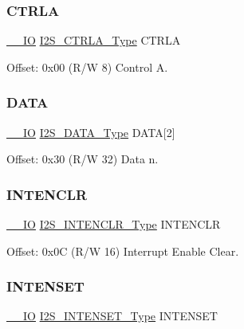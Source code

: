 \mbox{\label{struct_i2s_a9283c3350b6c2e04296fed8cf61be81b}} 
\subsubsection{\texorpdfstring{CTRLA}{CTRLA}}
{\footnotesize\ttfamily \mbox{\hyperlink{core__cm0plus_8h_aec43007d9998a0a0e01faede4133d6be}{\+\_\+\+\_\+\+IO}} \mbox{\hyperlink{union_i2_s___c_t_r_l_a___type}{I2\+S\+\_\+\+C\+T\+R\+L\+A\+\_\+\+Type}} C\+T\+R\+LA}



Offset\+: 0x00 (R/W 8) Control A. 

\mbox{\label{struct_i2s_a87228deaa60486edbc1bb08edca4e971}} 
\subsubsection{\texorpdfstring{DATA}{DATA}}
{\footnotesize\ttfamily \mbox{\hyperlink{core__cm0plus_8h_aec43007d9998a0a0e01faede4133d6be}{\+\_\+\+\_\+\+IO}} \mbox{\hyperlink{union_i2_s___d_a_t_a___type}{I2\+S\+\_\+\+D\+A\+T\+A\+\_\+\+Type}} D\+A\+TA\mbox{[}2\mbox{]}}



Offset\+: 0x30 (R/W 32) Data n. 

\mbox{\label{struct_i2s_a74d9fa452e3c9c2c39e61ce72320c4b9}} 
\subsubsection{\texorpdfstring{INTENCLR}{INTENCLR}}
{\footnotesize\ttfamily \mbox{\hyperlink{core__cm0plus_8h_aec43007d9998a0a0e01faede4133d6be}{\+\_\+\+\_\+\+IO}} \mbox{\hyperlink{union_i2_s___i_n_t_e_n_c_l_r___type}{I2\+S\+\_\+\+I\+N\+T\+E\+N\+C\+L\+R\+\_\+\+Type}} I\+N\+T\+E\+N\+C\+LR}



Offset\+: 0x0C (R/W 16) Interrupt Enable Clear. 

\mbox{\label{struct_i2s_a9a8942c1f47510e4f02c5ce67a9a7cd2}} 
\subsubsection{\texorpdfstring{INTENSET}{INTENSET}}
{\footnotesize\ttfamily \mbox{\hyperlink{core__cm0plus_8h_aec43007d9998a0a0e01faede4133d6be}{\+\_\+\+\_\+\+IO}} \mbox{\hyperlink{union_i2_s___i_n_t_e_n_s_e_t___type}{I2\+S\+\_\+\+I\+N\+T\+E\+N\+S\+E\+T\+\_\+\+Type}} I\+N\+T\+E\+N\+S\+ET}



